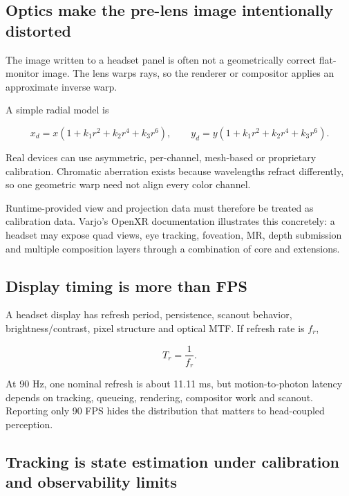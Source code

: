 \subsection{Optics make the pre-lens image intentionally distorted}\label{04-visual-computing-ii-ch035-optics-make-the-pre-lens-image-intentionally-distorted}

The image written to a headset panel is often not a geometrically correct flat-monitor image. The lens warps rays, so the renderer or compositor applies an approximate inverse warp.

A simple radial model is

\[
x_d=x(1+k_1r^2+k_2r^4+k_3r^6), \qquad
y_d=y(1+k_1r^2+k_2r^4+k_3r^6).
\]

Real devices can use asymmetric, per-channel, mesh-based or proprietary calibration. Chromatic aberration exists because wavelengths refract differently, so one geometric warp need not align every color channel.

Runtime-provided view and projection data must therefore be treated as calibration data. Varjo's OpenXR documentation illustrates this concretely: a headset may expose quad views, eye tracking, foveation, MR, depth submission and multiple composition layers through a combination of core and extensions.

\subsection{Display timing is more than FPS}\label{04-visual-computing-ii-ch035-display-timing-is-more-than-fps}

A headset display has refresh period, persistence, scanout behavior, brightness/contrast, pixel structure and optical MTF. If refresh rate is \(f_r\),

\[
T_r=\frac{1}{f_r}.
\]

At 90 Hz, one nominal refresh is about 11.11 ms, but motion-to-photon latency depends on tracking, queueing, rendering, compositor work and scanout. Reporting only 90 FPS hides the distribution that matters to head-coupled perception.

\subsection{Tracking is state estimation under calibration and observability limits}\label{04-visual-computing-ii-ch035-tracking-is-state-estimation-under-calibration-and-observability-limits}

